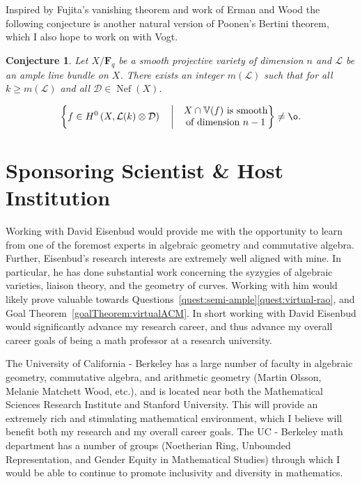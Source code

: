 \documentclass[11pt,reqno]{amsart}
\newtheorem{conj}[lemma]{Conjecture}
\theoremstyle{remark}
\newcommand{\Nef}{\operatorname{Nef}}
\newcommand{\fF}{\mathbf F}
\newcommand{\cD}{\mathcal{D}}
\newcommand{\cL}{\mathcal{L}}
\newcommand{\V}{\mathbb{V}}
\begin{document}
Inspired by Fujita's vanishing theorem and work of Erman and Wood the following conjecture is another natural version of Poonen's Bertini theorem, which I also hope to work on with Vogt.  


 \begin{conj}\label{conj:bertini-fujita}
 Let $X/\fF_{q}$ be a smooth projective variety of dimension $n$ and $\cL$ be an ample line bundle on $X$. There exists an integer $m(\cL)$ such that for all $k\geq m(\cL)$ and all $\cD\in \Nef(X)$. 

\begin{equation}
\left\{
f \in H^0\left(X, \cL(k)\otimes \cD\right) \quad \bigg| \quad 
\begin{matrix}
 \text{$X\cap\V(f)$ is smooth}\\
 \text{of dimension $n-1$}
 \end{matrix}
\right\}\neq\o.
\end{equation}
 \end{conj}
 
 \section{Sponsoring Scientist \& Host Institution}
 
Working with David Eisenbud would provide me with the opportunity to learn from one of the foremost experts in algebraic geometry and commutative algebra. Further, Eisenbud's research interests are extremely well aligned with mine. In particular, he has done substantial work concerning the syzygies of algebraic varieties, liaison theory, and the geometry of curves. Working with him would likely prove valuable towards Questions~\ref{quest:semi-ample}\ref{quest:virtual-rao}, and Goal Theorem~\ref{goalTheorem:virtualACM}. In short working with David Eisenbud would significantly advance my research career, and thus advance my overall career goals of being a math professor at a research university.

The University of California - Berkeley has a large number of faculty in algebraic geometry, commutative algebra, and arithmetic geometry (Martin Olsson, Melanie Matchett Wood, etc.), and is located near both the Mathematical Sciences Research Institute and Stanford University. This will provide an extremely rich and stimulating mathematical environment, which I believe will benefit both my research and my overall career goals. The UC - Berkeley math department has a number of groups (Noetherian Ring, Unbounded Representation, and Gender Equity in Mathematical Studies) through which I would be able to continue to promote inclusivity and diversity in mathematics. 
\end{document}
